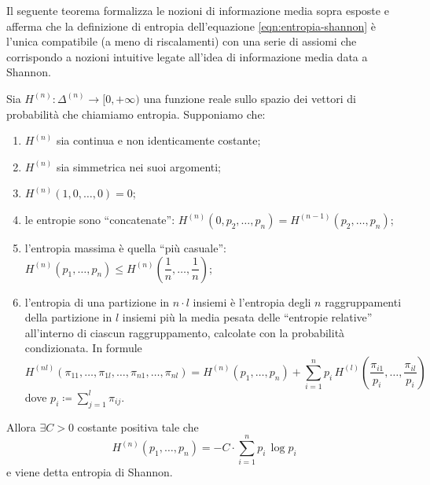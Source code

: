 Il seguente teorema formalizza le nozioni di informazione media sopra esposte e afferma che la definizione di entropia dell'equazione \eqref{eqn:entropia-shannon} è l'unica compatibile (a meno di riscalamenti) con una serie di assiomi che corrispondo a nozioni intuitive legate all'idea di informazione media data a Shannon.

\begin{thm}
    Sia $ H^{(n)} \colon \Delta^{(n)} \to [0, +\infty) $ una funzione reale sullo spazio dei vettori di probabilità che chiamiamo entropia. Supponiamo che:    \begin{enumerate}[label=(\roman*)]
        \item\label{pt:continua} $ H^{(n)} $ sia continua e non identicamente costante;
        \item $ H^{(n)} $ sia simmetrica nei suoi argomenti;
        \item $ H^{(n)}(1, 0, \ldots, 0) = 0 $;
        \item\label{pt:concat} le entropie sono ``concatenate'': $ H^{(n)}(0, p_2, \ldots, p_n) = H^{(n-1)}(p_2, \ldots, p_n) $;
        \item\label{pt:max} l'entropia massima è quella ``più casuale'': $ H^{(n)}(p_1, \ldots, p_n) \leq H^{(n)}\left(\dfrac{1}{n}, \ldots, \dfrac{1}{n}\right) $;
        \item\label{pt:formula} l'entropia di una partizione in $ n \cdot l $ insiemi è l'entropia degli $ n $ raggruppamenti della partizione in $ l $ insiemi più la media pesata delle ``entropie relative'' all'interno di ciascun raggruppamento, calcolate con la probabilità condizionata. In formule
        \[
            H^{(nl)}(\pi_{11}, \ldots, \pi_{1l}, \ldots, \pi_{n1}, \ldots, \pi_{nl}) = H^{(n)}(p_1, \ldots, p_n) + \sum_{i=1}^{n} p_i \, H^{(l)} \left(\dfrac{\pi_{i1}}{p_i}, \ldots, \dfrac{\pi_{il}}{p_i}\right)
        \]
        dove $ p_i \coloneqq \sum_{j = 1}^{l} \pi_{ij} $.
    \end{enumerate}
    Allora $ \exists C > 0 $ costante positiva tale che
    \[
        H^{(n)}(p_1, \ldots, p_n) = -C \cdot \sum_{i = 1}^{n} p_i \, \log{p_i}
    \]
    e viene detta entropia di Shannon.
\end{thm}
